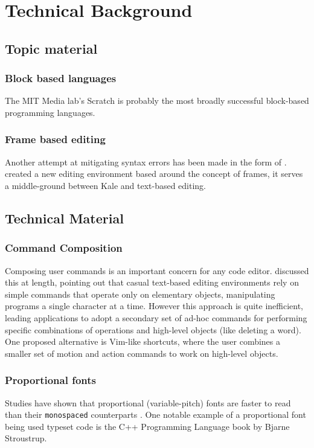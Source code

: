 \chapter{Technical Background}

\section{Topic material}

\subsection{Block based languages}

The MIT Media lab's Scratch \citep{Maloney2010} is probably the most broadly
successful block-based programming languages.

\subsection{Frame based editing}

Another attempt at mitigating syntax errors has been made in the form of
.  \citet{Kolling2017} created a new
editing environment based around the concept of frames, it serves a middle-ground
between Kale and text-based editing.

\section{Technical Material}

\subsection{Command Composition}
Composing user commands is an important concern for any code editor.
\citet{Chodarev2016} discussed this at length, pointing out that casual
text-based editing environments rely on simple commands that operate only on
elementary objects, manipulating programs a single character at a time. However this
approach is quite inefficient, leading applications to adopt a secondary set of
ad-hoc commands for performing specific combinations of operations and
high-level objects (like deleting a word). One proposed alternative is
Vim-like shortcuts, where the user combines a smaller set of motion and action
commands to work on high-level objects.

\subsection{Proportional fonts}
Studies have shown that
proportional (variable-pitch) fonts are
faster to read than their \texttt{monospaced} counterparts \citep{Campbell1981,
Beldie1983}. One notable example
of a proportional font being used typeset code is the C++ Programming Language
book by Bjarne Stroustrup.

